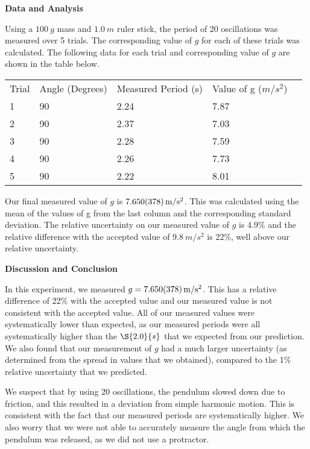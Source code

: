 \textbf{Data and Analysis}

Using a $\SI{100}{g}$ mass and $\SI{1.0}{m}$ ruler stick, the period of 20 oscillations was measured over 5 trials. The corresponding value of $g$ for each of these trials was calculated. The following data for each trial and corresponding value of $g$ are shown in the table below. 

\begin{table}[H]
\begin{tabular}{|l|l|l|l|l}
\cline{1-4}
Trial & Angle (Degrees) & Measured Period (s) & Value of g ($m/s^2$) &  \\ \cline{1-4}
1     & 90              & 2.24                & 7.87                         &  \\ \cline{1-4}
2     & 90              & 2.37                & 7.03                         &  \\ \cline{1-4}
3     & 90              & 2.28                & 7.59                         &  \\ \cline{1-4}
4     & 90              & 2.26                & 7.73                         &  \\ \cline{1-4}
5     & 90              & 2.22                & 8.01                         &  \\ \cline{1-4}
\end{tabular}
\end{table}

Our final measured value of $g$ is $\SI{7.65\pm 0.378}{m/s^2}$. This was calculated using the mean of the values of g from the last column and the corresponding standard deviation. The relative uncertainty on our measured value of $g$ is 4.9\% and the relative difference with the accepted value of $\SI{9.8}{m/s^2}$ is 22\%, well above our relative uncertainty.

\textbf{Discussion and Conclusion}

In this experiment, we measured $g=\SI{7.65\pm 0.378}{m/s^2}$. This has a relative difference of 22\% with the accepted value and our measured value is not consistent with the accepted value. All of our measured values were systematically lower than expected, as our measured periods were all systematically higher than the $\S{2.0}{s}$ that we expected from our prediction. We also found that our measurement of $g$ had a much larger uncertainty (as determined from the spread in values that we obtained), compared to the 1\% relative uncertainty that we predicted.

We suspect that by using 20 oscillations, the pendulum slowed down due to friction, and this resulted in a deviation from simple harmonic motion. This is consistent with the fact that our measured periods are systematically higher. We also worry that we were not able to accurately measure the angle from which the pendulum was released, as we did not use a protractor.

